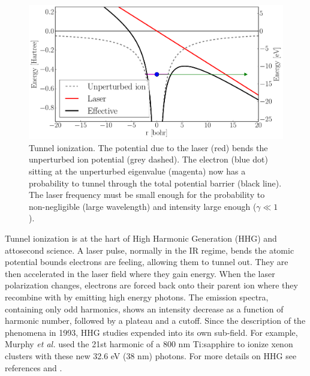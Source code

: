 \begin{figure}
 \centering
 \includegraphics[width=\figurewidth]{figures/ionization_tunnel}
 \caption{\label{fig:ionization:tunnel}Tunnel ionization. The potential
          due to the laser (red) bends the unperturbed ion potential
          (grey dashed). The electron (blue dot) sitting at the unperturbed
          eigenvalue (magenta) now has a probability to tunnel through the total
          potential barrier (black line). The laser frequency must be small
          enough for the probability to non-negligible (large wavelength)
          and intensity large enough ($\gamma \ll 1$).}
\end{figure}

Tunnel ionization is at the hart of High Harmonic Generation (HHG) and
attosecond science\cite{Fennel2010}. A laser pulse, normally in the IR regime,
bends the atomic potential bounds electrons are feeling, allowing them to tunnel
out. They are then accelerated in the laser field where they gain energy. When
the laser polarization changes, electrons are forced back onto their parent ion
where they recombine with by emitting high energy photons. The emission spectra,
containing only odd harmonics, shows an intensity decrease as a function of
harmonic number, followed by a plateau and a cutoff. Since the description
of the phenomena in 1993\cite{Corkum1993}, HHG studies expended into its own
sub-field. For example, Murphy \textit{et al.} used the 21st harmonic of a
800 nm Ti:sapphire to ionize xenon clusters\cite{Murphy2008a,Murphy2008b}
with these new 32.6 eV (38 nm) photons.
For more details on HHG see references \cite{Levesque2006} and
\cite{Lewenstein2008}.

